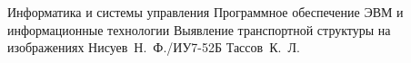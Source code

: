 \makeresearchtitle
    {Информатика и системы управления}
    {Программное обеспечение ЭВМ и информационные технологии}
    {Выявление транспортной структуры на изображениях}
    {Нисуев~Н.~Ф./ИУ7-52Б}
    {Тассов~К.~Л.}
    {}